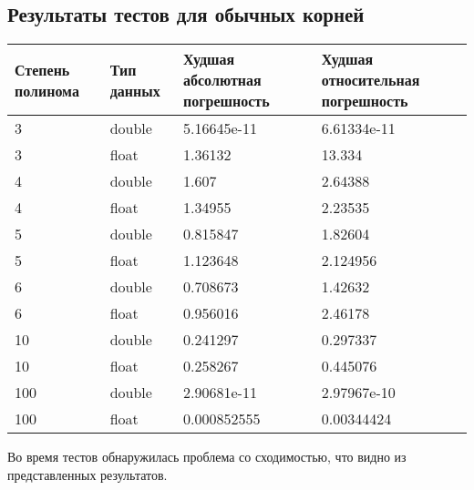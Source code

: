 \documentclass[a4paper,12pt]{article}
\begin{document}
\subsection{Результаты тестов для обычных корней}
\begin{center}
  \begin{tabular}{|p{2.5cm}|p{3.0cm}|p{5.0cm}|p{5.0cm}|}
  \hline
  \textbf{Степень полинома}  & \textbf{Тип данных} & \textbf{Худшая абсолютная погрешность} & \textbf{Худшая относительная погрешность} \\
  \hline
  3 & double & 5.16645e-11 & 6.61334e-11 \\
  \hline
  3 & float & 1.36132 & 13.334 \\
  \hline
  4 & double & 1.607 & 2.64388 \\
  \hline
  4 & float & 1.34955 & 2.23535 \\
  \hline
  5 & double & 0.815847 & 1.82604 \\
  \hline
  5 & float & 1.123648 & 2.124956 \\
  \hline
  6 & double & 0.708673 & 1.42632 \\
  \hline
  6 & float & 0.956016 & 2.46178 \\
  \hline
  10 & double & 0.241297 & 0.297337 \\
  \hline
  10 & float & 0.258267 & 0.445076 \\
  \hline
  100 & double & 2.90681e-11 & 2.97967e-10 \\
  \hline
  100 & float & 0.000852555 & 0.00344424 \\
  \hline
\end{tabular}
\label{tab:my_label_2}
\end{center}

Во время тестов обнаружилась проблема со сходимостью, что видно из представленных результатов.
\end{document}
